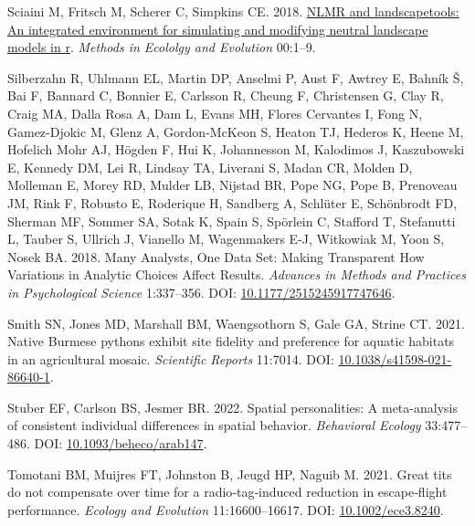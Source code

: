 \documentclass[10pt,a4paper]{article}
\newlength{\cslhangindent}
\newlength{\cslentryspacingunit} %
\newenvironment{CSLReferences}[2] %
 {%
  \setlength{\parindent}{0pt}
  \ifodd #1
  \let\oldpar\par
  \def\par{\hangindent=\cslhangindent\oldpar}
  \fi
  \setlength{\parskip}{#2\cslentryspacingunit}
 }%
 {}
\begin{document}
\begin{CSLReferences}{1}{0}
\leavevmode{}%
Sciaini M, Fritsch M, Scherer C, Simpkins CE. 2018. \href{https://doi.org/10.1111/2041-210X.13076}{NLMR and landscapetools: An integrated environment for simulating and modifying neutral landscape models in r}. \emph{Methods in Ecololgy and Evolution} 00:1--9.

\leavevmode{}%
Silberzahn R, Uhlmann EL, Martin DP, Anselmi P, Aust F, Awtrey E, Bahník Š, Bai F, Bannard C, Bonnier E, Carlsson R, Cheung F, Christensen G, Clay R, Craig MA, Dalla Rosa A, Dam L, Evans MH, Flores Cervantes I, Fong N, Gamez-Djokic M, Glenz A, Gordon-McKeon S, Heaton TJ, Hederos K, Heene M, Hofelich Mohr AJ, Högden F, Hui K, Johannesson M, Kalodimos J, Kaszubowski E, Kennedy DM, Lei R, Lindsay TA, Liverani S, Madan CR, Molden D, Molleman E, Morey RD, Mulder LB, Nijstad BR, Pope NG, Pope B, Prenoveau JM, Rink F, Robusto E, Roderique H, Sandberg A, Schlüter E, Schönbrodt FD, Sherman MF, Sommer SA, Sotak K, Spain S, Spörlein C, Stafford T, Stefanutti L, Tauber S, Ullrich J, Vianello M, Wagenmakers E-J, Witkowiak M, Yoon S, Nosek BA. 2018. Many {Analysts}, {One} {Data} {Set}: {Making} {Transparent} {How} {Variations} in {Analytic} {Choices} {Affect} {Results}. \emph{Advances in Methods and Practices in Psychological Science} 1:337--356. DOI: \href{https://doi.org/10.1177/2515245917747646}{10.1177/2515245917747646}.

\leavevmode{}%
Smith SN, Jones MD, Marshall BM, Waengsothorn S, Gale GA, Strine CT. 2021. Native {Burmese} pythons exhibit site fidelity and preference for aquatic habitats in an agricultural mosaic. \emph{Scientific Reports} 11:7014. DOI: \href{https://doi.org/10.1038/s41598-021-86640-1}{10.1038/s41598-021-86640-1}.

\leavevmode{}%
Stuber EF, Carlson BS, Jesmer BR. 2022. Spatial personalities: A meta-analysis of consistent individual differences in spatial behavior. \emph{Behavioral Ecology} 33:477--486. DOI: \href{https://doi.org/10.1093/beheco/arab147}{10.1093/beheco/arab147}.

\leavevmode{}%
Tomotani BM, Muijres FT, Johnston B, Jeugd HP, Naguib M. 2021. Great tits do not compensate over time for a radio‐tag‐induced reduction in escape‐flight performance. \emph{Ecology and Evolution} 11:16600--16617. DOI: \href{https://doi.org/10.1002/ece3.8240}{10.1002/ece3.8240}.


\end{CSLReferences}
\end{document}
